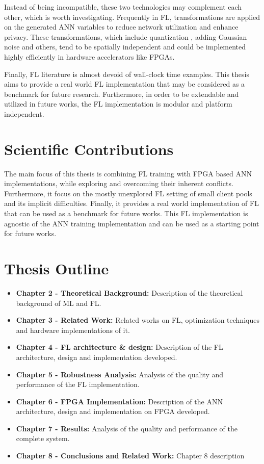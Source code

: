 Instead of being incompatible, these two technologies may complement each other, which is worth investigating. Frequently in FL, transformations are applied on the generated ANN variables to reduce network utilization and enhance privacy. These transformations, which include quantization \cite{Mills2020}, adding Gaussian noise \cite{Wei2020} and others, tend to be spatially independent and could be implemented highly efficiently in hardware accelerators like FPGAs.

Finally, FL literature is almost devoid of wall-clock time examples. This thesis aims to provide a real world FL implementation that may be considered as a benchmark for future research. Furthermore, in order to be extendable and utilized in future works, the FL implementation is modular and platform independent.


\section{Scientific Contributions}

The main focus of this thesis is combining FL training with FPGA based ANN implementations, while exploring and overcoming their inherent conflicts. Furthermore, it focus on the mostly unexplored FL setting of small client pools and its implicit difficulties. Finally, it provides a real world implementation of FL that can be used as a benchmark for future works. This FL implementation is agnostic of the ANN training implementation and can be used as a starting point for future works.

\section{Thesis Outline}
\begin{itemize}
    \item \textbf{Chapter 2 - Theoretical Background:} Description of the theoretical background of ML and FL.
    \item \textbf{Chapter 3 - Related Work:} Related works on FL, optimization techniques and hardware implementations of it.
    \item \textbf{Chapter 4 - FL architecture \& design:} Description of the FL architecture, design and implementation developed.
    \item \textbf{Chapter 5 - Robustness Analysis:} Analysis of the quality and performance of the FL implementation.
    \item \textbf{Chapter 6 - FPGA Implementation:} Description of the ANN architecture, design and implementation on FPGA developed.
    \item \textbf{Chapter 7 - Results:} Analysis of the quality and performance of the complete system.
    \item \textbf{Chapter 8 - Conclusions and Related Work:} Chapter 8 description %
\end{itemize}
